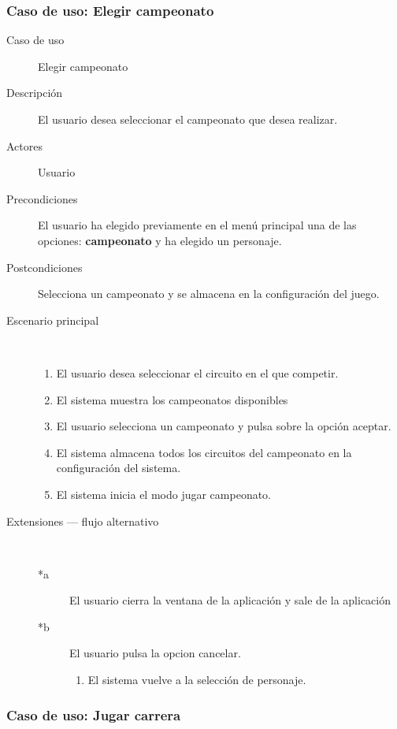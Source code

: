 \subsubsection{Caso de uso: Elegir campeonato}

\begin{description}
    \item[Caso de uso] Elegir campeonato
    \item[Descripción] El usuario desea seleccionar el campeonato que desea realizar.
    \item[Actores] Usuario
    \item[Precondiciones] El usuario ha elegido previamente en el menú principal una de las opciones: \textbf{campeonato} y ha
    elegido un personaje.
    \item[Postcondiciones] Selecciona un campeonato y se almacena en la configuración del juego.
    \item[Escenario principal] $\quad$
        \begin{enumerate}
            \item El usuario desea seleccionar el circuito en el que competir.
            \item El sistema muestra los campeonatos disponibles
            \item El usuario selecciona un campeonato y pulsa sobre la opción aceptar.
            \item El sistema almacena todos los circuitos del campeonato en la configuración del sistema.
            \item El sistema inicia el modo jugar campeonato.
        \end{enumerate}
    \item[Extensiones --- flujo alternativo] $\quad$
        \begin{description}
            \item[*a ] El usuario cierra la ventana de la aplicación y sale de la aplicación
            \item[*b ] El usuario pulsa la opcion cancelar.
            \begin{enumerate}
                \item El sistema vuelve a la selección de personaje.
            \end{enumerate}
        \end{description}
\end{description}

\subsubsection{Caso de uso: Jugar carrera}

